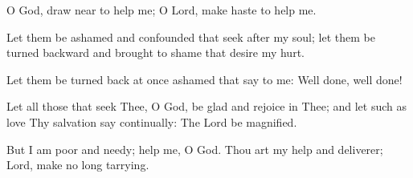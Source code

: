 O God, draw near to help me; O Lord, make haste to help me.

Let them be ashamed and confounded that seek after my soul; let them be turned backward and brought to shame that desire my
hurt.

Let them be turned back at once ashamed that say to me: Well done, well done!

Let all those that seek Thee, O God, be glad and rejoice in Thee; and let such as love Thy salvation say continually: The Lord be magnified.

But I am poor and needy; help me, O God. Thou art my help and deliverer; Lord, make no long tarrying.
